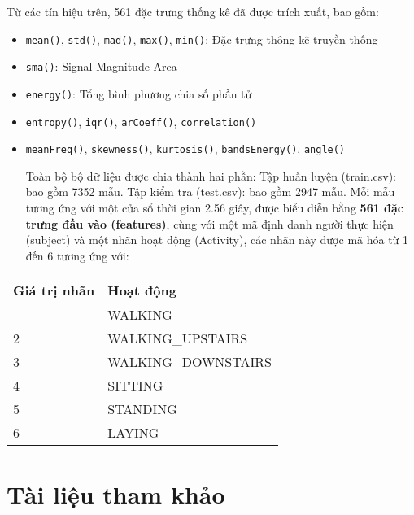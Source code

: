 \documentclass[
]{article}
\begin{document}
Từ các tín hiệu trên, 561 đặc trưng thống kê đã được trích xuất, bao
gồm:

\begin{itemize}
\item
  \texttt{mean()}, \texttt{std()}, \texttt{mad()}, \texttt{max()},
  \texttt{min()}: Đặc trưng thông kê truyền thống
\item
  \texttt{sma()}: Signal Magnitude Area
\item
  \texttt{energy()}: Tổng bình phương chia số phần tử
\item
  \texttt{entropy()}, \texttt{iqr()}, \texttt{arCoeff()},
  \texttt{correlation()}
\item
  \texttt{meanFreq()}, \texttt{skewness()}, \texttt{kurtosis()},
  \texttt{bandsEnergy()}, \texttt{angle()}

  Toàn bộ bộ dữ liệu được chia thành hai phần: Tập huấn luyện
  (train.csv): bao gồm 7352 mẫu. Tập kiểm tra (test.csv): bao gồm 2947
  mẫu. Mỗi mẫu tương ứng với một cửa sổ thời gian 2.56 giây, được biểu
  diễn bằng \textbf{561 đặc trưng đầu vào (features)}, cùng với một mã
  định danh người thực hiện (subject) và một nhãn hoạt động (Activity),
  các nhãn này được mã hóa từ 1 đến 6 tương ứng với:
\end{itemize}

\begin{longtable}[]{@{}ll@{}}
\toprule\noalign{}
Giá trị nhãn & Hoạt động \\
\midrule\noalign{}
\endhead
\bottomrule\noalign{}
\endlastfoot
1 & WALKING \\
2 & WALKING\_UPSTAIRS \\
3 & WALKING\_DOWNSTAIRS \\
4 & SITTING \\
5 & STANDING \\
6 & LAYING \\
\end{longtable}

\newpage

\section*{Tài liệu tham khảo}\label{tuxe0i-liux1ec7u-tham-khux1ea3o}
\end{document}
